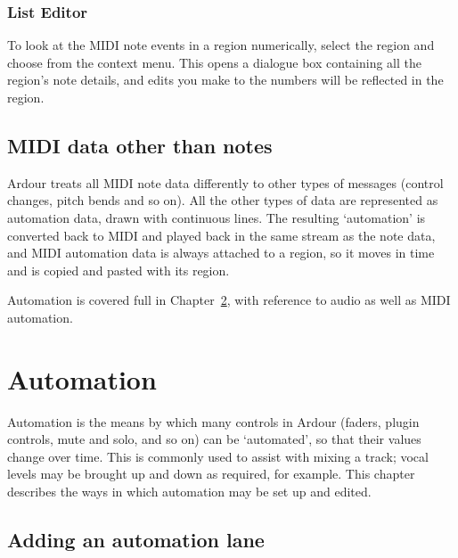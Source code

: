 \documentclass[10pt,a4paper]{book}
\newcommand{\menu}[1]{\emph{\StrSubstitute{#1}{,}{ $\rightarrow$ }}}
\begin{document}
\subsection{List Editor}

To look at the MIDI note events in a region numerically, select the
region and choose \menu{MIDI,List Editor\ldots} from the context menu.
This opens a dialogue box containing all the region's note details,
and edits you make to the numbers will be reflected in the region.


\section{MIDI data other than notes}
\label{sec:midi-non-note}

Ardour treats all MIDI note data differently to other types of
messages (control changes, pitch bends and so on).  All the other
types of data are represented as automation data, drawn with
continuous lines.  The resulting `automation' is converted back to
MIDI and played back in the same stream as the note data, and MIDI
automation data is always attached to a region, so it moves in time
and is copied and pasted with its region.

Automation is covered full in Chapter~\ref{ch:automation}, with
reference to audio as well as MIDI automation.






\chapter{Automation}
\label{ch:automation}

Automation is the means by which many controls in Ardour (faders,
plugin controls, mute and solo, and so on) can be `automated', so that
their values change over time.  This is commonly used to assist with
mixing a track; vocal levels may be brought up and down as required,
for example.  This chapter describes the ways in which automation may
be set up and edited.

\section{Adding an automation lane}
\end{document}
